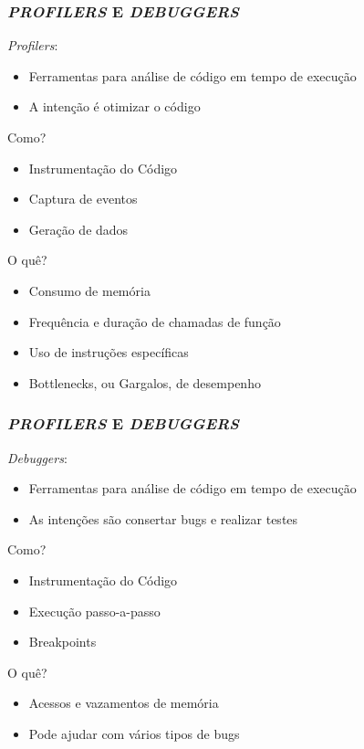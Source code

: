 \documentclass[10pt, compress]{beamer}
\begin{document}
\begin{frame}
    \frametitle{\textit{PROFILERS} E \textit{DEBUGGERS}}
    \textit{Profilers}:
    \begin{itemize}
        \item Ferramentas para análise de código \alert{em tempo de execução}
        \item A intenção é \alert{otimizar o código}
    \end{itemize}
    \pause
    Como?
    \begin{itemize}
        \item Instrumentação do Código
        \item Captura de eventos
        \item Geração de dados
    \end{itemize}
    \pause
    O quê?
    \begin{itemize}
        \item Consumo de memória
        \item Frequência e duração de chamadas de função
        \item Uso de instruções específicas
        \pause
        \item \alert{Bottlenecks}, ou \alert{Gargalos}, de desempenho
    \end{itemize}
\end{frame}

\begin{frame}
    \frametitle{\textit{PROFILERS} E \textit{DEBUGGERS}}
    \textit{Debuggers}:
    \begin{itemize}
        \item Ferramentas para análise de código \alert{em tempo de execução}
        \item As intenções são \alert{consertar bugs} e realizar \alert{testes}
    \end{itemize}
    \pause
    Como?
    \begin{itemize}
        \item Instrumentação do Código
        \item Execução passo-a-passo
        \item \alert{Breakpoints}
    \end{itemize}
    \pause
    O quê?
    \begin{itemize}
        \item Acessos e vazamentos de memória
        \item Pode ajudar com vários tipos de \alert{bugs} \smiley{}
    \end{itemize}
\end{frame}
\end{document}
